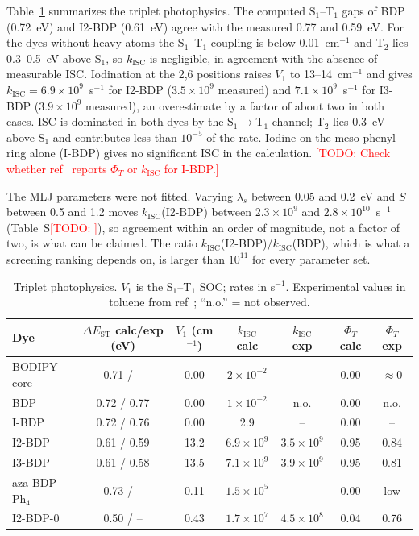 \documentclass[journal=jpcafh,manuscript=article]{achemso}
\newcommand{\todo}[1]{\textcolor{red}{[TODO: #1]}}
\newcommand{\kisc}{k_\mathrm{ISC}}
\begin{document}
Table~\ref{tab:isc} summarizes the triplet photophysics. The computed S$_1$--T$_1$ gaps of BDP
(0.72~eV) and I2-BDP (0.61~eV) agree with the measured 0.77 and 0.59~eV. For the dyes without heavy
atoms the S$_1$--T$_1$ coupling is below 0.01~cm$^{-1}$ and T$_2$ lies 0.3--0.5~eV above S$_1$, so
$\kisc$ is negligible, in agreement with the absence of measurable ISC. Iodination at the 2,6
positions raises $V_1$ to 13--14~cm$^{-1}$ and gives $\kisc=6.9\times10^{9}$~s$^{-1}$ for I2-BDP
($3.5\times10^{9}$ measured) and $7.1\times10^{9}$~s$^{-1}$ for I3-BDP ($3.9\times10^{9}$ measured),
an overestimate by a factor of about two in both cases. ISC is dominated in both dyes by the
S$_1\to$T$_1$ channel; T$_2$ lies 0.3~eV above S$_1$ and contributes less than $10^{-5}$ of the rate.
Iodine on the meso-phenyl ring alone (I-BDP) gives no significant ISC in the calculation.
\todo{Check whether ref~ reports $\Phi_T$ or $\kisc$ for I-BDP.}

The MLJ parameters were not fitted. Varying $\lambda_s$ between 0.05 and 0.2~eV and $S$ between 0.5
and 1.2 moves $\kisc$(I2-BDP) between $2.3\times10^{9}$ and $2.8\times10^{10}$~s$^{-1}$
(Table~S\todo{}), so agreement within an order of magnitude, not a factor of two, is what can be
claimed. The ratio $\kisc$(I2-BDP)/$\kisc$(BDP), which is what a screening ranking depends on, is
larger than $10^{11}$ for every parameter set.

\begin{table}
  \caption{Triplet photophysics. $V_1$ is the S$_1$--T$_1$ SOC; rates in s$^{-1}$. Experimental
  values in toluene from ref~; ``n.o.'' = not observed.}
  \label{tab:isc}
  \begin{tabular}{lcccccc}
    \toprule
    Dye & $\Delta E_\mathrm{ST}$ calc/exp (eV) & $V_1$ (cm$^{-1}$) & $\kisc$ calc & $\kisc$ exp &
    $\Phi_T$ calc & $\Phi_T$ exp \\
    \midrule
    BODIPY core    & 0.71 / --    & 0.00 & $2\times10^{-2}$ & --  & 0.00 & $\approx0$ \\
    BDP            & 0.72 / 0.77  & 0.00 & $1\times10^{-2}$ & n.o. & 0.00 & n.o. \\
    I-BDP          & 0.72 / 0.76  & 0.00 & 2.9 & -- & 0.00 & -- \\
    I2-BDP         & 0.61 / 0.59  & 13.2 & $6.9\times10^{9}$ & $3.5\times10^{9}$ & 0.95 & 0.84 \\
    I3-BDP         & 0.61 / 0.58  & 13.5 & $7.1\times10^{9}$ & $3.9\times10^{9}$ & 0.95 & 0.81 \\
    aza-BDP-Ph$_4$ & 0.73 / --    & 0.11 & $1.5\times10^{5}$ & -- & 0.00 & low \\
    \midrule
    I2-BDP-0       & 0.50 / --    & 0.43 & $1.7\times10^{7}$ & $4.5\times10^{8}$ & 0.04 & 0.76 \\
    \bottomrule
  \end{tabular}
\end{table}
\end{document}
